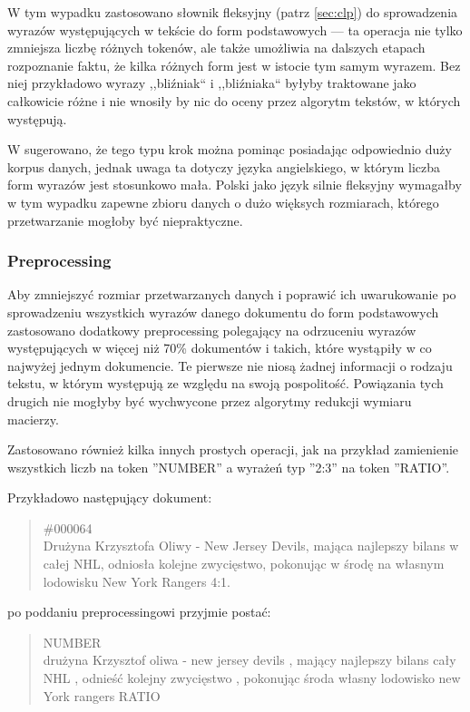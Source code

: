 \documentclass[11pt,a4paper]{article}
\begin{document}
W tym wypadku zastosowano słownik fleksyjny (patrz \ref{sec:clp}) do
sprowadzenia wyrazów występujących w tekście do form podstawowych --- ta
operacja nie tylko zmniejsza liczbę różnych tokenów, ale także umożliwia na
dalszych etapach rozpoznanie faktu, że kilka różnych form jest w istocie tym
samym wyrazem. Bez niej przykładowo wyrazy ,,bliźniak`` i ,,bliźniaka`` byłyby
traktowane jako całkowicie różne i nie wnosiły by nic do oceny przez algorytm
tekstów, w których występują.

W \cite{manning-schuetze} sugerowano, że tego typu krok można pominąc posiadając
odpowiednio duży korpus danych, jednak uwaga ta dotyczy języka angielskiego, w
którym liczba form wyrazów jest stosunkowo mała. Polski jako język silnie
fleksyjny wymagałby w tym wypadku zapewne zbioru danych o dużo więksych
rozmiarach, którego przetwarzanie mogłoby być niepraktyczne.

\subsubsection{Preprocessing}

Aby zmniejszyć rozmiar przetwarzanych danych i poprawić ich uwarukowanie po
sprowadzeniu wszystkich wyrazów danego dokumentu do form podstawowych
zastosowano dodatkowy preprocessing polegający na odrzuceniu wyrazów
występujących w więcej niż 70\% dokumentów i takich, które wystąpiły w co
najwyżej jednym dokumencie. Te pierwsze nie niosą żadnej informacji o rodzaju
tekstu, w którym występują ze względu na swoją pospolitość. Powiązania tych
drugich nie mogłyby być wychwycone przez algorytmy redukcji wymiaru macierzy.

Zastosowano również kilka innych prostych operacji, jak na przykład
zamienienie wszystkich liczb na token ''NUMBER'' a wyrażeń typ ''2:3''
na token ''RATIO''.

Przykładowo następujący dokument:

\begin{quote}
\#000064\\
Drużyna Krzysztofa Oliwy - New Jersey Devils, mająca najlepszy
bilans w całej NHL, odniosła kolejne zwycięstwo, pokonując w
środę na własnym lodowisku New York Rangers 4:1.
\end{quote}

po poddaniu preprocessingowi przyjmie postać:

\begin{quote}
NUMBER\\
drużyna Krzysztof oliwa - new jersey devils , mający najlepszy bilans
cały NHL , odnieść kolejny zwycięstwo , pokonując środa własny lodowisko new
York rangers RATIO
\end{quote}
\end{document}
